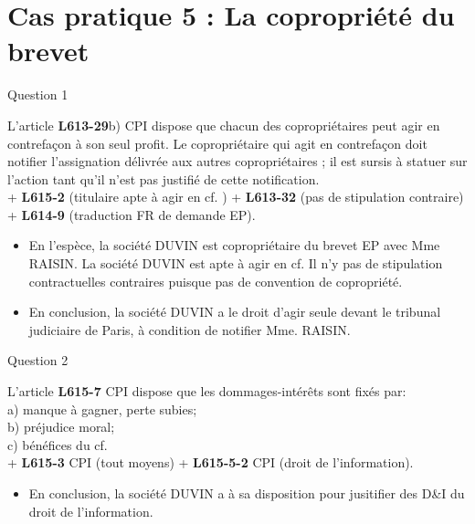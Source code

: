 
\section[Cas 5]{Cas pratique 5 : La copropriété du brevet}

\begin{frame}{Question 1}

\begin{block}{}
L'article \textbf{L613-29}b) CPI dispose que 
chacun des copropriétaires peut agir en contrefaçon à son seul profit. 
Le copropriétaire qui agit en contrefaçon doit notifier l'assignation délivrée
 aux autres copropriétaires ; il est sursis à statuer sur 
l'action tant qu'il n'est pas justifié de cette notification.\\
+ \textbf{L615-2} (titulaire apte à agir en cf. )
+ \textbf{L613-32} (pas de stipulation contraire)
+ \textbf{L614-9} (traduction FR de demande EP).
\end{block}

\begin{itemize}
  \item En l'espèce, la société DUVIN est copropriétaire du brevet EP avec Mme RAISIN.
  La société DUVIN est apte à agir en cf. Il n'y pas de stipulation contractuelles
  contraires puisque pas de convention de copropriété.
  \item En conclusion, la société DUVIN a le droit d'agir seule
  devant le tribunal judiciaire de Paris, à condition de notifier Mme. RAISIN.
\end{itemize}

\end{frame}

\begin{frame}{Question 2}

\begin{block}{}
L'article \textbf{L615-7} CPI dispose que les dommages-intérêts sont fixés par:\\
a) manque à gagner, perte subies;\\
b) préjudice moral;\\
c) bénéfices du cf.\\
+ \textbf{L615-3} CPI (tout moyens)
+ \textbf{L615-5-2} CPI (droit de l'information).
\end{block}

\begin{itemize}
  \item En conclusion, la société DUVIN a à sa disposition
  pour jusitifier des D\&I du droit de l'information.
\end{itemize}

\end{frame}

